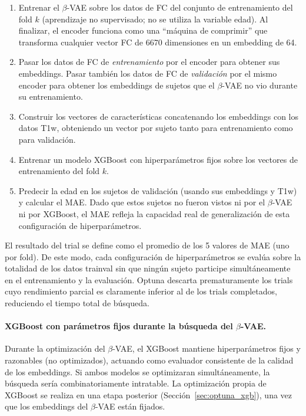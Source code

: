 \begin{enumerate}
    \item Entrenar el $\beta$-VAE sobre los datos de FC del conjunto de entrenamiento del fold $k$ (aprendizaje no supervisado; no se utiliza la variable edad). Al finalizar, el encoder funciona como una ``máquina de comprimir'' que transforma cualquier vector FC de 6670 dimensiones en un embedding de 64.
    \item Pasar los datos de FC de \emph{entrenamiento} por el encoder para obtener sus embeddings. Pasar también los datos de FC de \emph{validación} por el mismo encoder para obtener los embeddings de sujetos que el $\beta$-VAE no vio durante su entrenamiento.
    \item Construir los vectores de características concatenando los embeddings con los datos T1w, obteniendo un vector por sujeto tanto para entrenamiento como para validación.
    \item Entrenar un modelo XGBoost con hiperparámetros fijos sobre los vectores de entrenamiento del fold $k$.
    \item Predecir la edad en los sujetos de validación (usando sus embeddings y T1w) y calcular el MAE. Dado que estos sujetos no fueron vistos ni por el $\beta$-VAE ni por XGBoost, el MAE refleja la capacidad real de generalización de esta configuración de hiperparámetros.
\end{enumerate}

El resultado del trial se define como el promedio de los 5 valores de MAE (uno por fold). De este modo, cada configuración de hiperparámetros se evalúa sobre la totalidad de los datos trainval sin que ningún sujeto participe simultáneamente en el entrenamiento y la evaluación. Optuna descarta prematuramente los trials cuyo rendimiento parcial es claramente inferior al de los trials completados, reduciendo el tiempo total de búsqueda.

\paragraph{XGBoost con parámetros fijos durante la búsqueda del $\beta$-VAE.} Durante la optimización del $\beta$-VAE, el XGBoost mantiene hiperparámetros fijos y razonables (no optimizados), actuando como evaluador consistente de la calidad de los embeddings. Si ambos modelos se optimizaran simultáneamente, la búsqueda sería combinatoriamente intratable. La optimización propia de XGBoost se realiza en una etapa posterior (Sección~\ref{sec:optuna_xgb}), una vez que los embeddings del $\beta$-VAE están fijados.

